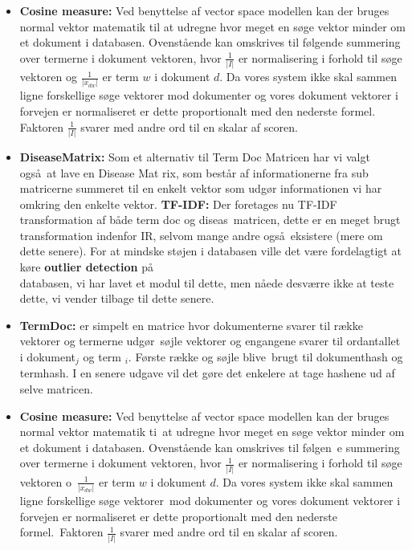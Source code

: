 \documentclass[a4paper, 10pt, english, final]{report}
\begin{document}
\begin{itemize}
    \item \textbf{Cosine measure:} Ved benyttelse af vector space modellen kan der bruges normal vektor matematik til at udregne hvor meget en s\o ge vektor minder om et dokument i databasen. Ovenst\aa ende kan omskrives til f\o lgende summering over termerne i dokument vektoren, hvor $\frac{1}{|I|}$ er normalisering i forhold til s\o ge vektoren og $\frac{1}{|x_{dw}|}$ er term $w$ i dokument $d$. Da vores system ikke skal sammen ligne forskellige s\o ge vektorer mod dokumenter og vores dokument vektorer i forvejen er normaliseret er dette proportionalt med den nederste formel. Faktoren $\frac{1}{|I|}$ svarer med andre ord til en skalar af scoren.

    \item \textbf{DiseaseMatrix:} Som et alternativ til Term Doc Matricen har vi valgt ogs\aa\ at lave en Disease Mat
rix, som best\aa r af informationerne fra sub matricerne summeret til en enkelt vektor som udg\o r informationen vi har omkring den enkelte vektor. \textbf{TF-IDF:} Der foretages nu TF-IDF transformation af b\aa de term doc og diseas\
 matricen, dette er en meget brugt transformation indenfor IR, selvom mange andre ogs\aa\ eksistere (mere om dette senere). For at mindske st\o jen i databasen ville det v\ae re fordelagtigt at k\o re \textbf{outlier detection} p\aa\\
databasen, vi har lavet et modul til dette, men n\aa ede desv\ae rre ikke at teste dette, vi vender tilbage til dette
 senere.

    \item \textbf{TermDoc:} er simpelt en matrice hvor dokumenterne svarer til r\ae kke vektorer og termerne udg\o r\
s\o jle vektorer og engangene svarer til ordantallet i dokument$_j$ og term $_i$. F\o rste r\ae kke og s\o jle blive\
 brugt til dokumenthash og termhash. I en senere udgave vil det g\o re det enkelere at tage hashene ud af selve matricen.

    \item \textbf{Cosine measure:} Ved benyttelse af vector space modellen kan der bruges normal vektor matematik ti\
 at udregne hvor meget en s\o ge vektor minder om et dokument i databasen. Ovenst\aa ende kan omskrives til f\o lgen\
e summering over termerne i dokument vektoren, hvor $\frac{1}{|I|}$ er normalisering i forhold til s\o ge vektoren o\
 $\frac{1}{|x_{dw}|}$ er term $w$ i dokument $d$. Da vores system ikke skal sammen ligne forskellige s\o ge vektorer\
mod dokumenter og vores dokument vektorer i forvejen er normaliseret er dette proportionalt med den nederste formel.\
Faktoren $\frac{1}{|I|}$ svarer med andre ord til en skalar af scoren.


\end{itemize}
\end{document}
